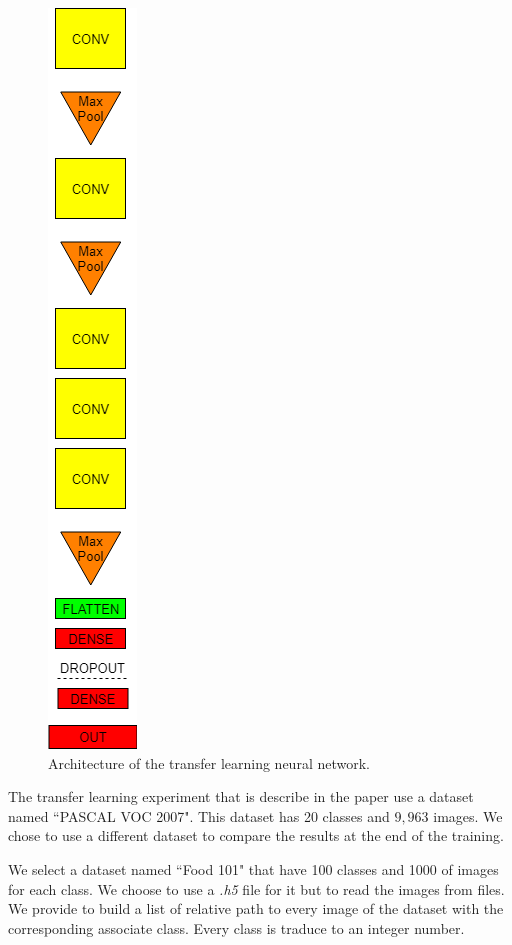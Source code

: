 \begin{figure}[!ht]
    \centering
    \includegraphics[scale=0.50]{images/FT_net.png}
    \caption{Architecture of the transfer learning neural network.}
    \label{fig:FT_net}
\end{figure}

The transfer learning experiment that is describe in the paper use a dataset named \textquotedblleft PASCAL VOC 2007". This dataset has 20 classes and $9,963$ images. We chose to use a different dataset to compare the results at the end of the training.

We select a dataset named \textquotedblleft Food 101" \cite{food_images} that have 100 classes and 1000 of images for each class. We choose to use a \textit{.h5} file for it but to read the images from files. We provide to build a list of relative path to every image of the dataset with the corresponding associate class. Every class is traduce to an integer number. 

